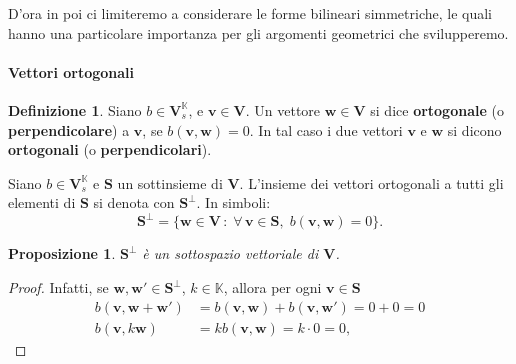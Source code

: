 \documentclass{article}
\theoremstyle{plain}
\newtheorem{prop}[thm]{Proposizione}
\theoremstyle{definition}
\newtheorem{defn}{Definizione}[section]
\theoremstyle{remark}
\begin{document}
\vspace{10pt}

D'ora in poi ci limiteremo a considerare le forme bilineari simmetriche, le quali hanno una particolare importanza per gli argomenti geometrici che svilupperemo.

\vspace{10pt}

\paragraph{Vettori ortogonali}
\begin{bxthm}
\begin{defn}
Siano $b\in\mathbf{V}^\mathbb{K}_s$, e $\mathbf{v} \in \mathbf{V}$. 
Un vettore $\mathbf{w} \in \mathbf{V}$ si dice \textbf{ortogonale} (o \textbf{perpendicolare}) a $\mathbf{v}$, 
se $b(\mathbf{v}, \mathbf{w}) = 0$. In tal caso i due vettori $\mathbf{v}$ e $\mathbf{w}$ si dicono \textbf{ortogonali} 
(o \textbf{perpendicolari}).    
\end{defn}
\end{bxthm}

\vspace{10pt}

Siano $b\in\mathbf{V}^\mathbb{K}_s$ e $\mathbf{S}$ un sottinsieme di $\mathbf{V}$. 
L'insieme dei vettori ortogonali a tutti gli elementi di $\mathbf{S}$ si denota con $\mathbf{S}^{\perp}$. In simboli:
\[\mathbf{S}^{\perp} = \{\mathbf{w} \in \mathbf{V} \,:\; \forall\, \mathbf{v} \in \mathbf{S},\; b(\mathbf{v}, \mathbf{w}) = 0 \}.\]

\vspace{10pt}

\begin{bxthm}
\begin{prop}
$\mathbf{S}^{\perp}$ è un sottospazio vettoriale di $\mathbf{V}$.    
\end{prop}
\end{bxthm}
\begin{proof}
Infatti, se $\mathbf{w}, \mathbf{w}' \in \mathbf{S}^{\perp}$, $k \in \mathbb{K}$, allora per ogni $\mathbf{v} \in \mathbf{S}$
\begin{align*}
b(\mathbf{v}, \mathbf{w} + \mathbf{w}') &= b(\mathbf{v}, \mathbf{w}) + b(\mathbf{v}, \mathbf{w}') = 0 + 0 = 0 \\
b(\mathbf{v}, k\mathbf{w}) &= kb(\mathbf{v}, \mathbf{w}) = k \cdot 0 = 0,
\end{align*}   
\end{proof}
\end{document}
